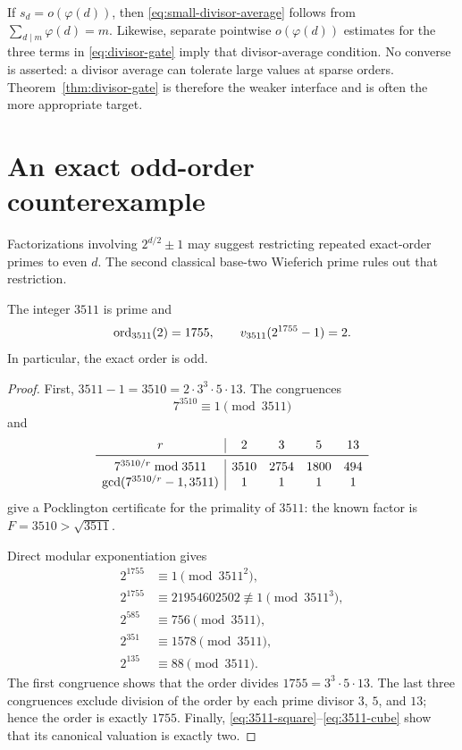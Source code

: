 If $s_d=o(\varphi(d))$, then \eqref{eq:small-divisor-average} follows from
$\sum_{d\mid m}\varphi(d)=m$.  Likewise, separate pointwise
$o(\varphi(d))$ estimates for the three terms in
\eqref{eq:divisor-gate} imply that divisor-average condition.  No converse
is asserted: a divisor average can tolerate large values at sparse orders.
Theorem~\ref{thm:divisor-gate} is therefore the weaker interface and is
often the more appropriate target.

\section{An exact odd-order counterexample}
\label{sec:3511}

Factorizations involving $2^{d/2}\pm1$ may suggest restricting repeated
exact-order primes to even $d$.  The second classical base-two Wieferich
prime rules out that restriction.

\begin{proposition}
\label{prop:3511}
The integer $3511$ is prime and
\begin{equation}
   \operatorname{ord}_{3511}(2)=1755,
   \qquad
   v_{3511}(2^{1755}-1)=2.
 \label{eq:3511-conclusion}
\end{equation}
In particular, the exact order is odd.
\end{proposition}

\begin{proof}
First, $3511-1=3510=2\cdot3^3\cdot5\cdot13$.  The congruences
\[
 7^{3510}\equiv1\pmod{3511}
\]
and
\[
\begin{array}{c|cccc}
 r&2&3&5&13\\ \midrule
 7^{3510/r}\bmod3511&3510&2754&1800&494\\
 \gcd(7^{3510/r}-1,3511)&1&1&1&1
\end{array}
\]
give a Pocklington certificate for the primality of $3511$: the known
factor is $F=3510>\sqrt{3511}$.

Direct modular exponentiation gives
\begin{align}
 2^{1755}&\equiv1\pmod {3511^2},
 \label{eq:3511-square}\\
 2^{1755}&\equiv21954602502\not\equiv1\pmod {3511^3},
 \label{eq:3511-cube}\\
 2^{585}&\equiv756\pmod {3511},\\
 2^{351}&\equiv1578\pmod {3511},\\
 2^{135}&\equiv88\pmod {3511}.
 \label{eq:3511-order-checks}
\end{align}
The first congruence shows that the order divides
$1755=3^3\cdot5\cdot13$.  The last three congruences exclude division of
the order by each prime divisor $3$, $5$, and $13$; hence the order is
exactly $1755$.  Finally,
\eqref{eq:3511-square}--\eqref{eq:3511-cube} show that its canonical
valuation is exactly two.
\end{proof}

